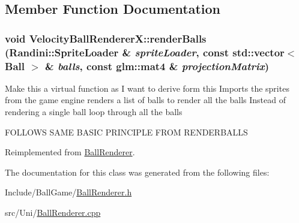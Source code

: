 \subsection{Member Function Documentation}
\hypertarget{classVelocityBallRendererX_ad0ef24ce7ba5116231f4a47aff280f12}{
\subsubsection[{renderBalls}]{\setlength{\rightskip}{0pt plus 5cm}void VelocityBallRendererX::renderBalls ({\bf Randini::SpriteLoader} \& {\em spriteLoader}, \/  const std::vector$<$ {\bf Ball} $>$ \& {\em balls}, \/  const glm::mat4 \& {\em projectionMatrix})}}
\label{classVelocityBallRendererX_ad0ef24ce7ba5116231f4a47aff280f12}
Make this a virtual function as I want to derive form this Imports the sprites from the game engine renders a list of balls to render all the balls Instead of rendering a single ball loop through all the balls 

FOLLOWS SAME BASIC PRINCIPLE FROM RENDERBALLS 

Reimplemented from \hyperlink{classBallRenderer_a6169ba2a00e8d15fde87a3ee4552cf66}{BallRenderer}.

The documentation for this class was generated from the following files:\begin{DoxyCompactItemize}
\item 
Include/BallGame/\hyperlink{BallRenderer_8h}{BallRenderer.h}\item 
src/Uni/\hyperlink{BallRenderer_8cpp}{BallRenderer.cpp}\end{DoxyCompactItemize}
